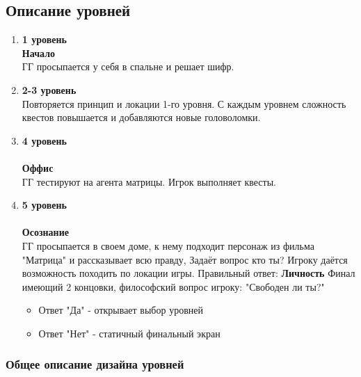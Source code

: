 \documentclass{article}
\begin{document}
\subsection{Описание уровней}
\begin{enumerate}[label=\arabic*., leftmargin=*]
    \item \textbf{1 уровень}\\
    \textbf{Начало}\\
    ГГ просыпается у себя в спальне и решает шифр.
\item \textbf{2-3 уровень}\\
Повторяется принцип и локации 1-го уровня. С каждым уровнем сложность квестов повышается и добавляются новые головоломки. 
\item \textbf{4 уровень}\\
\\ \textbf{Оффис}\\
 ГГ тестируют на агента матрицы. Игрок выполняет квесты.
 \item \textbf{5 уровень}\\
 \\ \textbf{Осознание}\\
 ГГ просыпается в своем доме, к нему подходит персонаж из фильма "Матрица" и рассказывает всю правду, Задаёт вопрос кто ты? Игроку даётся возможность походить по локации игры. Правильный ответ: \textbf{Личность} Финал имеющий 2 концовки, философский вопрос игроку: "Свободен ли ты?"
        \begin{itemize}
            \item Ответ "Да" - открывает выбор уровней
            \item Ответ "Нет" - статичный финальный экран
        \end{itemize}
\end{enumerate}

\subsubsection{Общее описание дизайна уровней}
\end{document}
